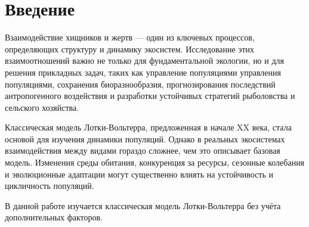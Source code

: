 \section{Введение}
Взаимодействие хищников и жертв — один из ключевых процессов, определяющих структуру и динамику экосистем. Исследование этих взаимоотношений важно не только для фундаментальной экологии, но и для решения прикладных задач, таких как управление популяциями управления популяциями, сохранения биоразнообразия, прогнозирования последствий антропогенного воздействия и разработки устойчивых стратегий рыболовства и сельского хозяйства.

Классическая модель Лотки-Вольтерра, предложенная в начале XX века, стала основой для изучения динамики популяций.
Однако в реальных экосистемах взаимодействия между видами гораздо сложнее, чем это описывает базовая модель. Изменения среды обитания, конкуренция за ресурсы, сезонные колебания и эволюционные адаптации могут существенно влиять на устойчивость и цикличность популяций. 

В данной работе изучается классическая модель Лотки-Вольтерра без учёта дополнительных факторов.
